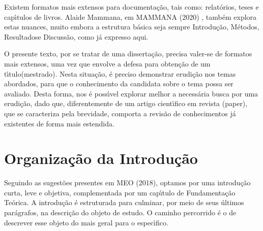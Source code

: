\documentclass[
12pt,		%
openright,	%
twoside,  %
a4paper,			%
chapter=TITLE,		%
english,			%
french,				%
spanish,			%
brazil				%
]{USPSC-classe/USPSC_RedarTex}
\begin{document}
Existem formatos mais extensos para documenta\c{c}\~ao, tais como: relat\'orios, teses e cap\'{\i}tulos de livros. Alaide Mammana, em  MAMMANA (2020) , tamb\'em explora estas nuances, muito embora a estrutura b\'asica seja sempre \textquotedbl Introdu\c{c}\~ao\textquotedbl , \textquotedbl M\'etodos\textquotedbl , \textquotedbl Resultados\textquotedbl  e \textquotedbl Discuss\~ao\textquotedbl , como j\'a expresso aqui.








O presente texto, por se tratar de uma disserta\c{c}\~ao, precisa valer-se de formatos mais extensos, uma vez que envolve a \textquotedbl defesa para obten\c{c}\~ao de um t\'{\i}tulo\textquotedbl  (mestrado). Nesta situa\c{c}\~ao, \'e preciso demonstrar erudi\c{c}\~ao nos temas abordados, para que o conhecimento da candidata sobre o tema possa ser avaliado. Desta forma, nos \'e poss\'{\i}vel explorar melhor a necess\'aria busca por uma erudi\c{c}\~ao, dado que, diferentemente de um artigo cient\'{\i}fico em revista (\textquotedbl paper\textquotedbl ), que se caracteriza pela brevidade,  comporta a revis\~ao de conhecimentos j\'a existentes de forma mais estendida.








\section[Organiza\c{c}\~ao da Introdu\c{c}\~ao]{Organiza\c{c}\~ao da Introdu\c{c}\~ao}\label{Organiza\c{c}\~ao da Introdu\c{c}\~ao}
Seguindo as sugest\~oes presentes em MEO (2018), optamos por uma introdu\c{c}\~ao curta, leve e objetiva, complementada por um cap\'{\i}tulo de \textquotedbl Fundamenta\c{c}\~ao Te\'orica\textquotedbl . A introdu\c{c}\~ao \'e estruturada para culminar, por meio de seus \'ultimos par\'agrafos, na descri\c{c}\~ao do objeto de estudo. O caminho percorrido \'e o de descrever esse objeto do mais geral para o espec\'{\i}fico.
\end{document}

